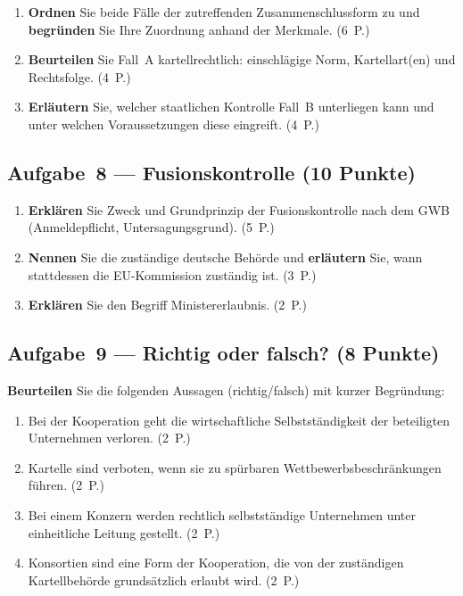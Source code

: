\documentclass[11pt, a4paper]{article}
\begin{document}
\begin{enumerate}[label=(\alph*)]
  \item \textbf{Ordnen} Sie beide Fälle der zutreffenden Zusammenschlussform zu und
    \textbf{begründen} Sie Ihre Zuordnung anhand der Merkmale. \hfill (6~P.)
  \item \textbf{Beurteilen} Sie Fall~A kartellrechtlich: einschlägige Norm,
    Kartellart(en) und Rechtsfolge. \hfill (4~P.)
  \item \textbf{Erläutern} Sie, welcher staatlichen Kontrolle Fall~B unterliegen kann
    und unter welchen Voraussetzungen diese eingreift. \hfill (4~P.)
\end{enumerate}

\subsection*{Aufgabe~8 --- Fusionskontrolle (10 Punkte)}

\begin{enumerate}[label=(\alph*)]
  \item \textbf{Erklären} Sie Zweck und Grundprinzip der Fusionskontrolle nach dem GWB
    (Anmeldepflicht, Untersagungsgrund). \hfill (5~P.)
  \item \textbf{Nennen} Sie die zuständige deutsche Behörde und \textbf{erläutern} Sie,
    wann stattdessen die EU-Kommission zuständig ist. \hfill (3~P.)
  \item \textbf{Erklären} Sie den Begriff Ministererlaubnis. \hfill (2~P.)
\end{enumerate}

\subsection*{Aufgabe~9 --- Richtig oder falsch? (8 Punkte)}

\textbf{Beurteilen} Sie die folgenden Aussagen (richtig/falsch) mit kurzer Begründung:

\begin{enumerate}[label=(\alph*)]
  \item Bei der Kooperation geht die wirtschaftliche Selbstständigkeit der beteiligten
    Unternehmen verloren. \hfill (2~P.)
  \item Kartelle sind verboten, wenn sie zu spürbaren Wettbewerbsbeschränkungen führen.
    \hfill (2~P.)
  \item Bei einem Konzern werden rechtlich selbstständige Unternehmen unter einheitliche
    Leitung gestellt. \hfill (2~P.)
  \item Konsortien sind eine Form der Kooperation, die von der zuständigen
    Kartellbehörde grundsätzlich erlaubt wird. \hfill (2~P.)
\end{enumerate}
\end{document}

